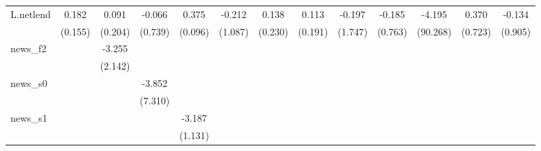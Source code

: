 {\begin{tabular}{l*{12}{c}}
\addlinespace
L.netlend   &       0.182         &       0.091         &      -0.066         &       0.375\sym{***}&      -0.212         &       0.138         &       0.113         &      -0.197         &      -0.185         &      -4.195         &       0.370         &      -0.134         \\
            &     (0.155)         &     (0.204)         &     (0.739)         &     (0.096)         &     (1.087)         &     (0.230)         &     (0.191)         &     (1.747)         &     (0.763)         &    (90.268)         &     (0.723)         &     (0.905)         \\
\addlinespace
news\_f2     &                     &      -3.255         &                     &                     &                     &                     &                     &                     &                     &                     &                     &                     \\
            &                     &     (2.142)         &                     &                     &                     &                     &                     &                     &                     &                     &                     &                     \\
\addlinespace
news\_s0     &                     &                     &      -3.852         &                     &                     &                     &                     &                     &                     &                     &                     &                     \\
            &                     &                     &     (7.310)         &                     &                     &                     &                     &                     &                     &                     &                     &                     \\
\addlinespace
news\_s1     &                     &                     &                     &      -3.187\sym{***}&                     &                     &                     &                     &                     &                     &                     &                     \\
            &                     &                     &                     &     (1.131)         &                     &                     &                     &                     &                     &                     &                     &                     \\

\end{tabular}}
